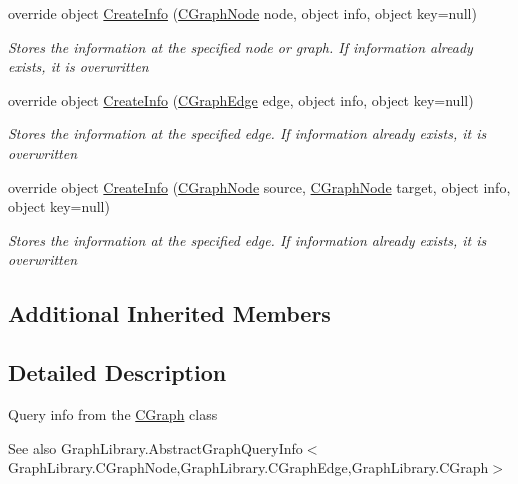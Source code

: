 \begin{DoxyCompactItemize}
override object \hyperlink{class_graph_library_1_1_c_graph_query_info_adc1215f254e82c2dfee52279b49bba64}{Create\+Info} (\hyperlink{class_graph_library_1_1_c_graph_node}{C\+Graph\+Node} node, object info, object key=null)
\begin{DoxyCompactList}\small\item\em Stores the information at the specified node or graph. If information already exists, it is overwritten \end{DoxyCompactList}\item 
override object \hyperlink{class_graph_library_1_1_c_graph_query_info_a7b0cf74374283e88bf6309acb1c63a2c}{Create\+Info} (\hyperlink{class_graph_library_1_1_c_graph_edge}{C\+Graph\+Edge} edge, object info, object key=null)
\begin{DoxyCompactList}\small\item\em Stores the information at the specified edge. If information already exists, it is overwritten \end{DoxyCompactList}\item 
override object \hyperlink{class_graph_library_1_1_c_graph_query_info_ab7bfe088c7bad560bf15784468f6eb2a}{Create\+Info} (\hyperlink{class_graph_library_1_1_c_graph_node}{C\+Graph\+Node} source, \hyperlink{class_graph_library_1_1_c_graph_node}{C\+Graph\+Node} target, object info, object key=null)
\begin{DoxyCompactList}\small\item\em Stores the information at the specified edge. If information already exists, it is overwritten \end{DoxyCompactList}\end{DoxyCompactItemize}
\subsection*{Additional Inherited Members}


\subsection{Detailed Description}
Query info from the \hyperlink{class_graph_library_1_1_c_graph}{C\+Graph} class 

\begin{DoxySeeAlso}{See also}
Graph\+Library.\+Abstract\+Graph\+Query\+Info$<$\+Graph\+Library.\+C\+Graph\+Node,\+Graph\+Library.\+C\+Graph\+Edge,\+Graph\+Library.\+C\+Graph$>$


\end{DoxySeeAlso}


